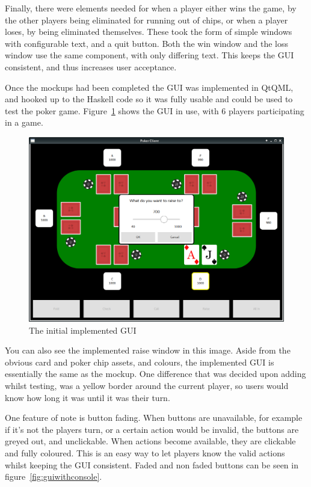 Finally, there were elements needed for when a player either wins the game,
by the other players being eliminated for running out of chips, or when a
player loses, by being eliminated themselves. These took the form of simple
windows with configurable text, and a quit button. Both the win window
and the loss window use the same component, with only differing text. This
keeps the GUI consistent, and thus increases user acceptance.

Once the mockups had been completed the GUI was implemented in QtQML,
and hooked up to the Haskell code so it was fully usable and could be used
to test the poker game. Figure~\ref{fig:actualgui} shows the GUI in use,
with 6 players participating in a game. 

\begin{figure}[h]
    \centering
    \includegraphics[width=\textwidth]{../images/actualgui.png}
    \caption{The initial implemented GUI}%
    \label{fig:actualgui}
\end{figure}

You can also see the implemented raise window in this image. Aside from the 
obvious card and poker chip assets, and colours, the implemented GUI is 
essentially the same as the mockup. One difference that was decided upon 
adding whilst testing, was a yellow border around the current player, so users 
would know how long it was until it was their turn. 

One feature of note is button fading. When buttons are unavailable, for
example if it's not the players turn, or a certain action would be invalid,
the buttons are greyed out, and unclickable. When actions become available,
they are clickable and fully coloured. This is an easy way to let players
know the valid actions whilst keeping the GUI consistent. Faded and non faded
buttons can be seen in figure~\ref{fig:guiwithconsole}.

